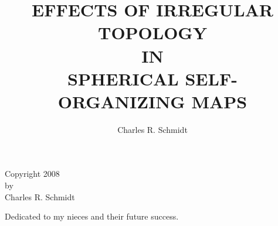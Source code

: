 \documentclass[doublespace]{sdsu-thesis}
\author{Charles R. Schmidt}
\title{EFFECTS OF IRREGULAR TOPOLOGY \\ IN \\ SPHERICAL SELF-ORGANIZING MAPS}
\begin{document}
\maketitle

\makesignature



\begin{copyrightpage}
Copyright 2008 \\
by \\
Charles R. Schmidt
\end{copyrightpage}

\begin{dedication}
\vspace{3in}
\centering
Dedicated to my nieces and their future success.
\end{dedication}


\begin{abstract}

\end{abstract}

\tableofcontents

\listoftables
\end{document}
